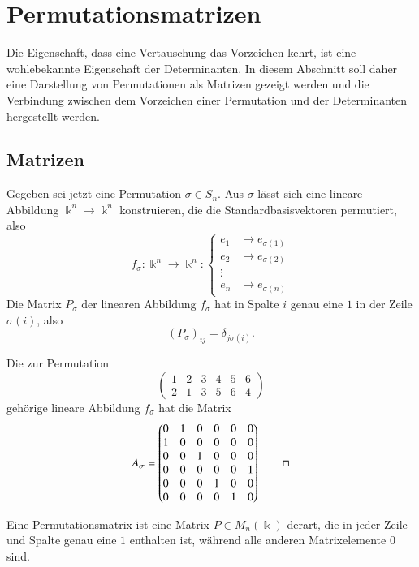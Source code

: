 %
%
%
\section{Permutationsmatrizen
\label{buch:section:permutationsmatrizen}}
Die Eigenschaft, dass eine Vertauschung das Vorzeichen kehrt, ist
eine wohlebekannte Eigenschaft der Determinanten.
In diesem Abschnitt soll daher eine Darstellung von Permutationen
als Matrizen gezeigt werden und die Verbindung zwischen dem
Vorzeichen einer Permutation und der Determinanten hergestellt
werden.

\subsection{Matrizen}
Gegeben sei jetzt eine Permutation $\sigma\in S_n$. 
Aus $\sigma$ lässt sich eine lineare Abbildung $\Bbbk^n\to\Bbbk^n$
konstruieren, die die Standardbasisvektoren permutiert, also
\[
f_{\sigma}\colon
\Bbbk^n \to \Bbbk^n
:
\left\{
\begin{aligned}
e_1&\mapsto e_{\sigma(1)} \\
e_2&\mapsto e_{\sigma(2)} \\
\vdots&\\
e_n&\mapsto e_{\sigma(n)}
\end{aligned}
\right.
\]
Die Matrix $P_\sigma$ der linearen Abbildung $f_{\sigma}$ hat in Spalte $i$
genau eine $1$ in der Zeile $\sigma(i)$, also
\[
(P_\sigma)_{ij} = \delta_{j\sigma(i)}.
\]

\begin{beispiel}
Die zur Permutation
\[
\begin{pmatrix}
1&2&3&4&5&6\\
2&1&3&5&6&4
\end{pmatrix}
\]
gehörige lineare Abbildung $f_\sigma$ hat die Matrix
\[
A_\sigma
=
\begin{pmatrix}
0&1&0&0&0&0\\
1&0&0&0&0&0\\
0&0&1&0&0&0\\
0&0&0&0&0&1\\
0&0&0&1&0&0\\
0&0&0&0&1&0
\end{pmatrix}
\qedhere
\]
\end{beispiel}

\begin{definition}
Eine Permutationsmatrix ist eine Matrix $P\in M_n(\Bbbk)$ 
derart, die in jeder Zeile und Spalte genau eine $1$ enthalten ist,
während alle anderen Matrixelemente $0$ sind.
\end{definition}

